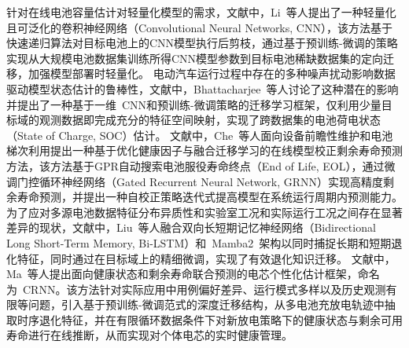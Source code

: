 针对在线电池容量估计对轻量化模型的需求，文献\cite{LI2021116410}中，Li~等人提出了一种轻量化且可泛化的卷积神经网络（Convolutional Neural Networks, CNN），该方法基于快速递归算法对目标电池上的CNN模型执行后剪枝，通过基于预训练-微调的策略实现从大规模电池数据集训练所得CNN模型参数到目标电池稀缺数据集的定向迁移，加强模型部署时轻量化。
电动汽车运行过程中存在的多种噪声扰动影响数据驱动模型状态估计的鲁棒性，文献\cite{9372902}中，Bhattacharjee~等人讨论了这种潜在的影响并提出了一种基于一维~CNN和预训练-微调策略的迁移学习框架，仅利用少量目标域的观测数据即完成充分的特征空间映射，实现了跨数据集的电池荷电状态（State of Charge, SOC）估计。
文献\cite{9343713}中，Che~等人面向设备前瞻性维护和电池梯次利用提出一种基于优化健康因子与融合迁移学习的在线模型校正剩余寿命预测方法，该方法基于GPR自动搜索电池服役寿命终点（End of Life, EOL），通过微调门控循环神经网络（Gated Recurrent Neural Network, GRNN）实现高精度剩余寿命预测，并提出一种自校正策略迭代式提高模型在系统运行周期内预测能力。
为了应对多源电池数据特征分布异质性和实验室工况和实际运行工况之间存在显著差异的现状，文献\cite{LIU2025115347}中，Liu~等人融合双向长短期记忆神经网络（Bidirectional Long Short-Term Memory, Bi-LSTM）和~Mamba2~架构以同时捕捉长期和短期退化特征，同时通过在目标域上的精细微调，实现了有效退化知识迁移。
文献\cite{D2EE01676A}中，Ma~等人提出面向健康状态和剩余寿命联合预测的电芯个性化估计框架，命名为~CRNN。该方法针对实际应用中用例偏好差异、运行模式多样以及历史观测有限等问题，引入基于预训练-微调范式的深度迁移结构，从多电池充放电轨迹中抽取时序退化特征，并在有限循环数据条件下对新放电策略下的健康状态与剩余可用寿命进行在线推断，从而实现对个体电芯的实时健康管理。
